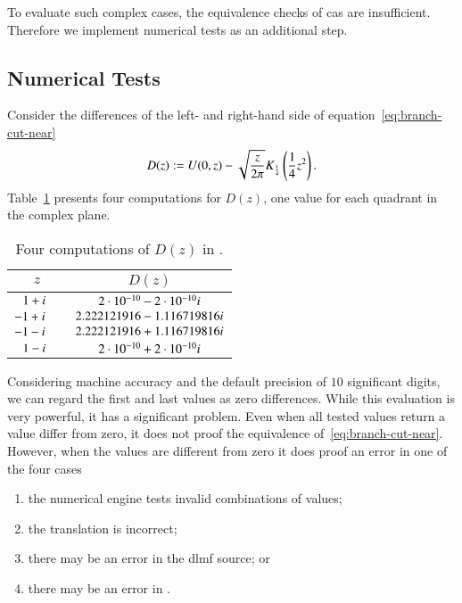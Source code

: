 
To evaluate such complex cases, the equivalence checks of \gls*{cas} are insufficient. Therefore we implement numerical tests as an additional step.

\subsection{Numerical Tests}\label{sec:numerical-tests}

Consider the differences of the left- and right-hand side of equation~\eqref{eq:branch-cut-near}
\begin{equation}\label{eq:difference}
D(z) := U(0,z) - \sqrt{\frac{z}{2{\pi}}} K_{\frac{1}{4}}\left(\frac{1}{4}z^2\right).
\end{equation}
Table~\ref{tab:computations-for-difference} presents four computations for $D(z)$, one value for each quadrant in the complex plane.
\begin{table}[ht]
\centering
\begin{tabular}{rcc}
	\hline
	$z\ \ $ & & $D(z)$\\
	\hline
	\tableRowSpace{} $1+{i}$ & & $2 \cdot 10^{-10} - 2 \cdot 10^{-10} {i}$\\
	$-1+{i}$& & $2.222121916 - 1.116719816 {i}$\\
	$-1-{i}$& & $2.222121916 + 1.116719816 {i}$\\
	$1-{i}$ & & $2 \cdot 10^{-10} + 2 \cdot 10^{-10} {i}$\\
	\hline
\end{tabular}
\caption{Four computations of $D(z)$ in \Maple.}
\label{tab:computations-for-difference}
\end{table}

Considering machine accuracy and the default precision of $10$ significant digits, we can regard the first and last values as zero differences. While this evaluation is very powerful, it has a significant problem. Even when all tested values return a value differ from zero, it does not proof the equivalence of~\eqref{eq:branch-cut-near}. However, when the values are different from zero it does proof an error in one of the four cases~\parencite{NumericalTests:Paper}
\begin{enumerate}
\item the numerical engine tests invalid combinations of values;
\item the translation is incorrect;
\item there may be an error in the \gls*{dlmf} source; or
\item there may be an error in \Maple.
\end{enumerate}


